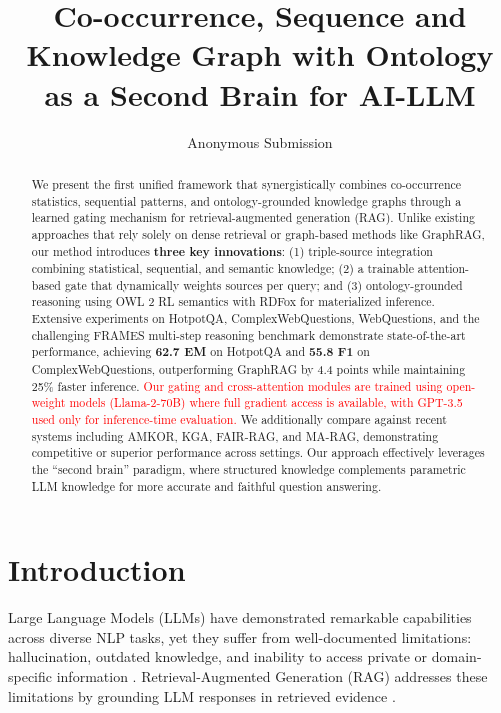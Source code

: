 \documentclass[10pt,twocolumn]{article}
\title{Co-occurrence, Sequence and Knowledge Graph with Ontology as a Second Brain for AI-LLM}
\author{Anonymous Submission}
\date{}
\newcommand{\revisioncritical}[1]{\textcolor{red}{#1}}
\begin{document}
\maketitle

\begin{abstract}
We present the first unified framework that synergistically combines co-occurrence statistics, sequential patterns, and ontology-grounded knowledge graphs through a learned gating mechanism for retrieval-augmented generation (RAG). Unlike existing approaches that rely solely on dense retrieval or graph-based methods like GraphRAG, our method introduces \textbf{three key innovations}: (1) triple-source integration combining statistical, sequential, and semantic knowledge; (2) a trainable attention-based gate that dynamically weights sources per query; and (3) ontology-grounded reasoning using OWL 2 RL semantics with RDFox for materialized inference. Extensive experiments on HotpotQA, ComplexWebQuestions, WebQuestions, and the challenging FRAMES multi-step reasoning benchmark \cite{krishna2024frames} demonstrate state-of-the-art performance, achieving \textbf{62.7 EM} on HotpotQA and \textbf{55.8 F1} on ComplexWebQuestions, outperforming GraphRAG by 4.4 points while maintaining 25\% faster inference. \revisioncritical{Our gating and cross-attention modules are trained using open-weight models (Llama-2-70B) where full gradient access is available, with GPT-3.5 used only for inference-time evaluation.} We additionally compare against recent systems including AMKOR, KGA, FAIR-RAG, and MA-RAG, demonstrating competitive or superior performance across settings. Our approach effectively leverages the ``second brain'' paradigm, where structured knowledge complements parametric LLM knowledge for more accurate and faithful question answering.
\end{abstract}

\section{Introduction}

Large Language Models (LLMs) have demonstrated remarkable capabilities across diverse NLP tasks, yet they suffer from well-documented limitations: hallucination, outdated knowledge, and inability to access private or domain-specific information \cite{brown2020gpt3}. Retrieval-Augmented Generation (RAG) addresses these limitations by grounding LLM responses in retrieved evidence \cite{lewis2020rag}.
\end{document}
